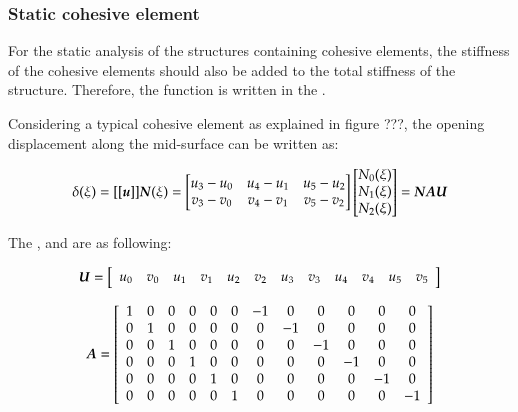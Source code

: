 \subsubsection{Static cohesive element}

For  the  static  analysis   of  the  structures  containing  cohesive
elements, the stiffness of the cohesive elements should also be added to the
total      stiffness       of      the      structure.      Therefore,
the  function    is written  in  the
.

Considering a typical cohesive element as explained in figure ???, the opening
displacement along the mid-surface can be written as:

\begin{equation}
  \label{eq:opening}
  \delta(\xi) = [[\boldsymbol{u}]] \boldsymbol{N}(\xi) =
\begin{bmatrix}
u_3-u_0 & u_4-u_1 & u_5-u_2\\
v_3-v_0 & v_4-v_1 & v_5-v_2
\end{bmatrix}
\begin{bmatrix}
N_0(\xi) \\ N_1(\xi) \\ N_2(\xi)
\end{bmatrix} =
\boldsymbol{N A U}
\end{equation}

 The  ,  and  are as following:

\begin{equation}
  \boldsymbol{U} = \left [
\begin{array}{c c c c c c c c c c c c}
u_0 & v_0 & u_1 & v_1 & u_2 & v_2 & u_3 & v_3 & u_4 & v_4 & u_5 & v_5
\end{array}\right ]
\end{equation}


\begin{equation}
  \boldsymbol{A} = \left [\begin{array}{c c c c c c c c c c c c}
1 & 0 & 0 & 0& 0 & 0 & -1& 0 & 0 &0 &0 &0\\
0 &1& 0&0 &0 &0 &0 & -1& 0& 0 & 0 &0\\
0 &0& 1&0 &0 &0 &0 & 0& -1& 0 & 0 &0\\
0 &0& 0&1 &0 &0 &0 & 0& 0& -1 & 0 &0\\
0 &0& 0&0 &1 &0 &0 & 0& 0& 0 & -1 &0\\
0 &0& 0&0 &0 &1 &0 & 0& 0& 0 & 0 &-1
\end{array} \right ]
\end{equation}


